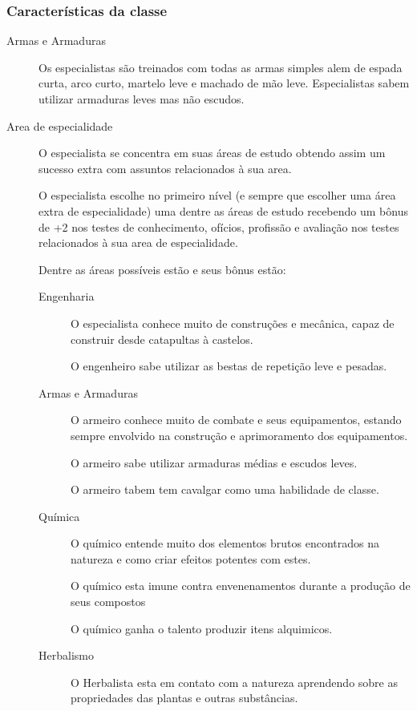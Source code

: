 \subsubsection{Caracter\'isticas da classe}
\begin{description}
\item[Armas e Armaduras]
Os especialistas s\~ao treinados com todas as armas simples alem
de espada curta,
arco curto, martelo leve e machado de m\~ao leve.
Especialistas sabem utilizar armaduras leves mas n\~ao escudos.

\item[Area de especialidade]
O especialista se concentra em suas \'areas de estudo
obtendo assim um sucesso extra com assuntos relacionados
\`a sua area.

O especialista escolhe no primeiro n\'ivel (e sempre que escolher
    uma \'area extra de especialidade) uma dentre
as \'areas de estudo recebendo um b\^onus de +2 nos testes
de conhecimento, of\'icios, profiss\~ao e avalia\c{c}\~ao
nos testes relacionados \`a sua area de especialidade.

Dentre as \'areas poss\'iveis est\~ao e seus b\^onus est\~ao:

\begin{description}
\item[Engenharia]
O especialista conhece muito de constru\c{c}\~oes e mec\^anica, capaz
de construir desde catapultas \`a castelos.

O engenheiro sabe utilizar as bestas de repeti\c{c}\~ao leve
e pesadas.

\item[Armas e Armaduras]
O armeiro conhece muito de combate e seus equipamentos, estando sempre
envolvido na constru\c{c}\~ao e aprimoramento dos equipamentos.

O armeiro sabe utilizar armaduras m\'edias e escudos leves.

O armeiro tabem tem cavalgar como uma habilidade de classe.

\item[Qu\'imica]
O qu\'imico entende muito dos elementos brutos encontrados
na natureza e como criar efeitos potentes com estes.

O qu\'imico esta imune contra envenenamentos durante
a produ\c{c}\~ao de seus compostos

O qu\'imico ganha o talento produzir itens alquimicos.

\item[Herbalismo]
O Herbalista esta em contato com a natureza aprendendo sobre
as propriedades das plantas e outras subst\^ancias.


\end{description}
\end{description}
